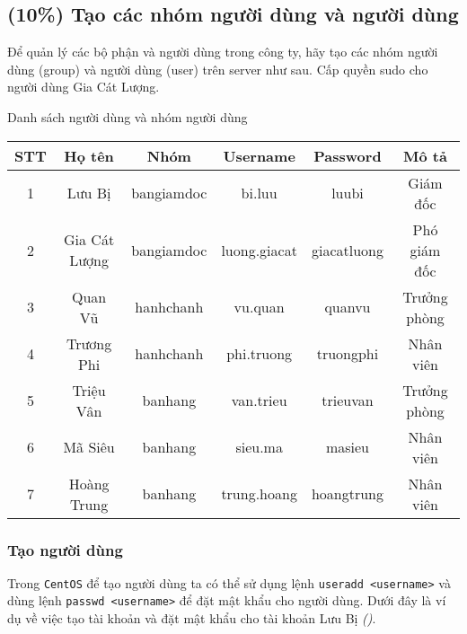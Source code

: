 \subsection{(10\%) Tạo các nhóm người dùng và người dùng}

Để quản lý các bộ phận và người dùng trong công ty, hãy tạo các nhóm
người dùng (group) và người dùng (user) trên server như sau.
Cấp quyền sudo cho người dùng Gia Cát Lượng.

\begin{minipage}{.93\linewidth}
  \centering
  \captionsetup{type=table}
  \caption{Danh sách người dùng và nhóm người dùng}
  {\small
    \begin{tabular}{| c | c | c | c | c | c |}
      \hline
      \textbf{STT} & \textbf{Họ tên} & \textbf{Nhóm} & \textbf{Username} & \textbf{Password} & \textbf{Mô tả} \\\hline
      1            & Lưu Bị          & bangiamdoc    & bi.luu            & luubi             & Giám đốc       \\\hline
      2            & Gia Cát Lượng   & bangiamdoc    & luong.giacat      & giacatluong       & Phó giám đốc   \\\hline
      3            & Quan Vũ         & hanhchanh     & vu.quan           & quanvu            & Trưởng phòng   \\\hline
      4            & Trương Phi      & hanhchanh     & phi.truong        & truongphi         & Nhân viên      \\\hline
      5            & Triệu Vân       & banhang       & van.trieu         & trieuvan          & Trưởng phòng   \\\hline
      6            & Mã Siêu         & banhang       & sieu.ma           & masieu            & Nhân viên      \\\hline
      7            & Hoàng Trung     & banhang       & trung.hoang       & hoangtrung        & Nhân viên      \\\hline
    \end{tabular}
  }
\end{minipage}

\subsubsection{Tạo người dùng}

Trong \texttt{CentOS} để tạo người dùng ta có thể sử dụng lệnh
\texttt{useradd <username>} và dùng lệnh \texttt{passwd <username>}
để đặt mật khẩu cho người dùng. Dưới đây là ví dụ về việc tạo tài khoản
và đặt mật khẩu cho tài khoản Lưu Bị \textit{()}.

